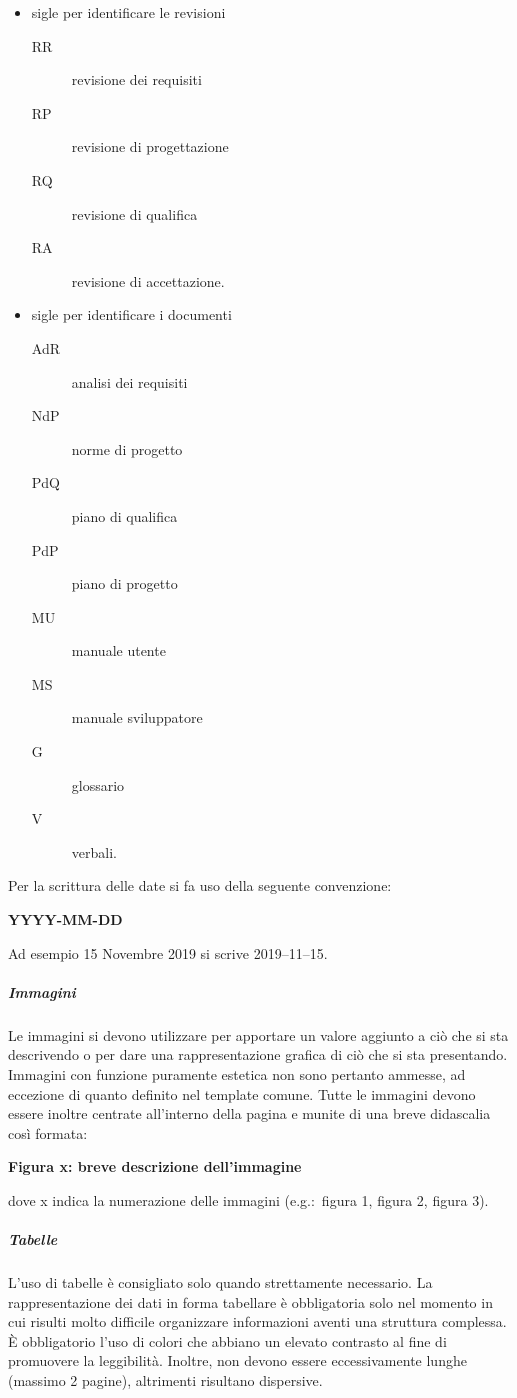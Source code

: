\documentclass[../norme-di-progetto.tex]{subfiles}
\begin{document}
\begin{itemize}
  \item sigle per identificare le revisioni
        \begin{description}
          \item [RR] revisione dei requisiti
          \item [RP] revisione di progettazione
          \item [RQ] revisione di qualifica
          \item [RA] revisione di accettazione.
        \end{description}
  \item sigle per identificare i documenti
        \begin{description}
          \item [AdR] analisi dei requisiti
          \item [NdP] norme di progetto
          \item [PdQ] piano di qualifica
          \item [PdP] piano di progetto
          \item [MU] manuale utente
          \item [MS] manuale sviluppatore
          \item [G] glossario
          \item [V] verbali.
        \end{description}
\end{itemize}
Per la scrittura delle date si fa uso della seguente convenzione:
\begin{center}
  \textbf{YYYY-MM-DD}
\end{center}
Ad esempio 15 Novembre 2019 si scrive 2019--11--15.
\subparagraph{Immagini}%
\label{subp:immagini}
Le immagini si devono utilizzare per apportare un valore aggiunto a ciò che si sta descrivendo o per dare una rappresentazione grafica di ciò che si sta presentando.
Immagini con funzione puramente estetica non sono pertanto ammesse, ad eccezione di quanto definito nel template comune.
Tutte le immagini devono essere inoltre centrate all'interno della pagina e munite di una breve didascalia così formata:
\begin{center}
  \textbf{Figura x: breve descrizione dell'immagine}
\end{center}
dove x indica la numerazione delle immagini (e.g.:\ figura 1, figura 2, figura 3).

\subparagraph{Tabelle}%
\label{subp:tabelle}
L'uso di tabelle è consigliato solo quando strettamente necessario. La rappresentazione dei dati in forma tabellare è obbligatoria solo nel momento in cui risulti molto difficile organizzare informazioni aventi una struttura complessa. È obbligatorio l'uso di colori che abbiano un elevato contrasto al fine di promuovere la leggibilità. Inoltre, non devono essere eccessivamente lunghe (massimo 2 pagine), altrimenti risultano dispersive.
\end{document}
